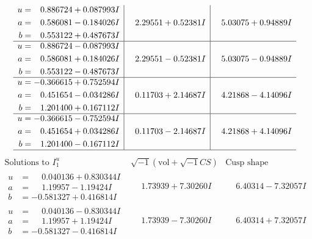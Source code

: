 \documentclass[1p]{elsarticle_modified}
\theoremstyle{definition}
\newcommand{\I}{\sqrt{-1}}
\begin{document}
$$\begin{array}{c|c|c}
\begin{aligned}
u &= \phantom{-}0.886724 + 0.087993 I \\
a &= \phantom{-}0.586081 - 0.184026 I \\
b &= \phantom{-}0.553122 + 0.487673 I\end{aligned}
 & \phantom{-}2.29551 + 0.52381 I & \phantom{-}5.03075 + 0.94889 I \\ \hline\begin{aligned}
u &= \phantom{-}0.886724 - 0.087993 I \\
a &= \phantom{-}0.586081 + 0.184026 I \\
b &= \phantom{-}0.553122 - 0.487673 I\end{aligned}
 & \phantom{-}2.29551 - 0.52381 I & \phantom{-}5.03075 - 0.94889 I \\ \hline\begin{aligned}
u &= -0.366615 + 0.752594 I \\
a &= \phantom{-}0.451654 - 0.034286 I \\
b &= \phantom{-}1.201400 + 0.167112 I\end{aligned}
 & \phantom{-}0.11703 + 2.14687 I & \phantom{-}4.21868 - 4.14096 I \\ \hline\begin{aligned}
u &= -0.366615 - 0.752594 I \\
a &= \phantom{-}0.451654 + 0.034286 I \\
b &= \phantom{-}1.201400 - 0.167112 I\end{aligned}
 & \phantom{-}0.11703 - 2.14687 I & \phantom{-}4.21868 + 4.14096 I\\
 \hline 
 \end{array}$$\newpage$$\begin{array}{c|c|c}  
\text{Solutions to }I^u_{1}& \I (\text{vol} + \sqrt{-1}CS) & \text{Cusp shape}\\
 \hline 
\begin{aligned}
u &= \phantom{-}0.040136 + 0.830344 I \\
a &= \phantom{-}1.19957 - 1.19424 I \\
b &= -0.581327 + 0.416814 I\end{aligned}
 & \phantom{-}1.73939 + 7.30260 I & \phantom{-}6.40314 - 7.32057 I \\ \hline\begin{aligned}
u &= \phantom{-}0.040136 - 0.830344 I \\
a &= \phantom{-}1.19957 + 1.19424 I \\
b &= -0.581327 - 0.416814 I\end{aligned}
 & \phantom{-}1.73939 - 7.30260 I & \phantom{-}6.40314 + 7.32057 I \\ \hline\begin{aligned}

\end{aligned}
\end{array}$$
\end{document}
